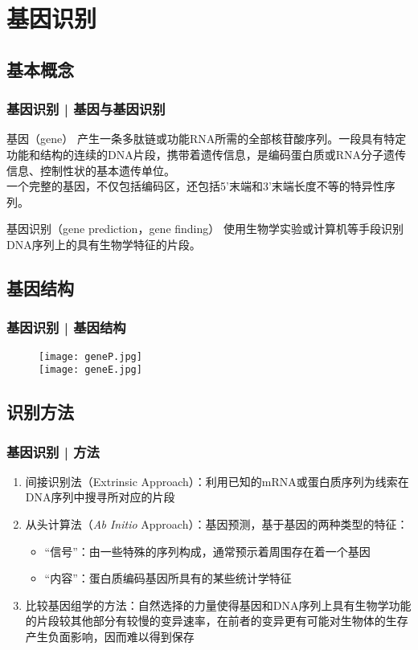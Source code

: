 \documentclass[table]{beamer}
\begin{document}
\section{基因识别}
\subsection{基本概念}
\begin{frame}
  \frametitle{基因识别 | 基因与基因识别}
  \begin{block}{基因（gene）}
    产生一条多肽链或功能RNA所需的全部核苷酸序列。一段具有特定功能和结构的连续的DNA片段，携带着遗传信息，是编码蛋白质或RNA分子遗传信息、控制性状的基本遗传单位。\\
    一个完整的基因，不仅包括编码区，还包括5'末端和3'末端长度不等的特异性序列。
  \end{block}
  \pause
  \begin{block}{基因识别（gene prediction，gene finding）}
    使用生物学实验或计算机等手段识别DNA序列上的具有生物学特征的片段。
  \end{block}
\end{frame}

\subsection{基因结构}
\begin{frame}
  \frametitle{基因识别 | 基因结构}
  \begin{figure}
    \centering
    \texttt{[image: geneP.jpg]}
    \\
    \texttt{[image: geneE.jpg]}
  \end{figure}
\end{frame}

\subsection{识别方法}
\begin{frame}
  \frametitle{基因识别 | 方法}
  \begin{enumerate}
    \item 间接识别法（Extrinsic Approach）：利用已知的mRNA或蛋白质序列为线索在DNA序列中搜寻所对应的片段
    \item 从头计算法（\textit{Ab Initio} Approach）：基因预测，基于基因的两种类型的特征：
      \begin{itemize}
        \item “信号”：由一些特殊的序列构成，通常预示着周围存在着一个基因
        \item “内容”：蛋白质编码基因所具有的某些统计学特征
      \end{itemize}
    \item 比较基因组学的方法：自然选择的力量使得基因和DNA序列上具有生物学功能的片段较其他部分有较慢的变异速率，在前者的变异更有可能对生物体的生存产生负面影响，因而难以得到保存
  \end{enumerate}
\end{frame}
\end{document}
